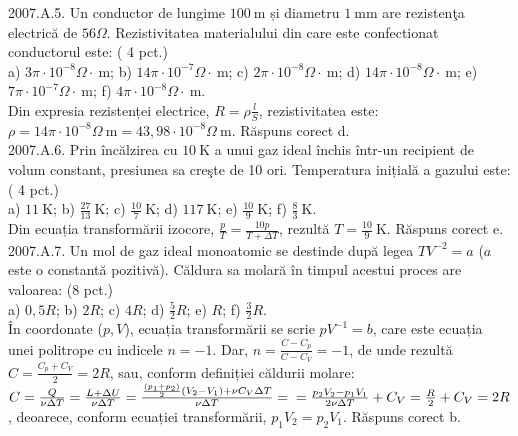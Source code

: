 2007.A.5. Un conductor de lungime $100 \mathrm{~m}$ și diametru $1 \mathrm{~mm}$ are rezistenţa electrică de $56 \Omega$. Rezistivitatea materialului din care este confectionat conductorul este: ( 4 pct.)\\ a) $3 \pi \cdot 10^{-8} \Omega \cdot \mathrm{~m}$; b) $14 \pi \cdot 10^{-7} \Omega \cdot \mathrm{~m}$; c) $2 \pi \cdot 10^{-8} \Omega \cdot \mathrm{~m}$; d) $14 \pi \cdot 10^{-8} \Omega \cdot \mathrm{~m}$; e) $7 \pi \cdot 10^{-7} \Omega \cdot \mathrm{~m}$; f) $4 \pi \cdot 10^{-8} \Omega \cdot \mathrm{~m}$.\\ Din expresia rezistenței electrice, $R=\rho \frac{l}{S}$, rezistivitatea este:\\ $\rho=14 \pi \cdot 10^{-8} \Omega \mathrm{~m}=43,98 \cdot 10^{-8} \Omega \mathrm{~m}$. Răspuns corect d.\\

2007.A.6. Prin încălzirea cu $10 \mathrm{~K}$ a unui gaz ideal închis într-un recipient de volum constant, presiunea sa creşte de 10 ori. Temperatura inițială a gazului este: ( 4 pct.)\\ a) $11 \mathrm{~K}$; b) $\frac{27}{13} \mathrm{~K}$; c) $\frac{10}{7} \mathrm{~K}$; d) $117 \mathrm{~K}$; e) $\frac{10}{9} \mathrm{~K}$; f) $\frac{8}{3} \mathrm{~K}$.\\ Din ecuația transformării izocore, $\frac{p}{T}=\frac{10 p}{T+\Delta T}$, rezultă $T=\frac{10}{9} \mathrm{~K}$. Răspuns corect e.\\

2007.A.7. Un mol de gaz ideal monoatomic se destinde după legea $T V^{-2}=a$ ($a$ este o constantă pozitivă). Căldura sa molară în timpul acestui proces are valoarea: (8 pct.)\\ a) $0,5 R$; b) $2 R$; c) $4 R$; d) $\frac{5}{2} R$; e) $R$; f) $\frac{3}{2} R$.\\ În coordonate ($p, V$), ecuația transformării se scrie $p V^{-1}=b$, care este ecuația unei politrope cu indicele $n=-1$. Dar, $n=\frac{C-C_{p}}{C-C_{V}}=-1$, de unde rezultă $C=\frac{C_{p}+C_{V}}{2}=2 R$, sau, conform definiției căldurii molare:\\ $C=\frac{Q}{\nu \Delta T}=\frac{L+\Delta U}{\nu \Delta T}=\frac{\frac{\left(p_{1}+p_{2}\right)}{2}\left(V_{2}-V_{1}\right)+\nu C_{V} \Delta T}{\nu \Delta T}= \\ =\frac{p_{2} V_{2}-p_{1} V_{1}}{2 \nu \Delta T}+C_{V}=\frac{R}{2}+C_{V}=2 R$, deoarece, conform ecuației transformării, $p_{1} V_{2}=p_{2} V_{1}$. Răspuns corect b.\\


